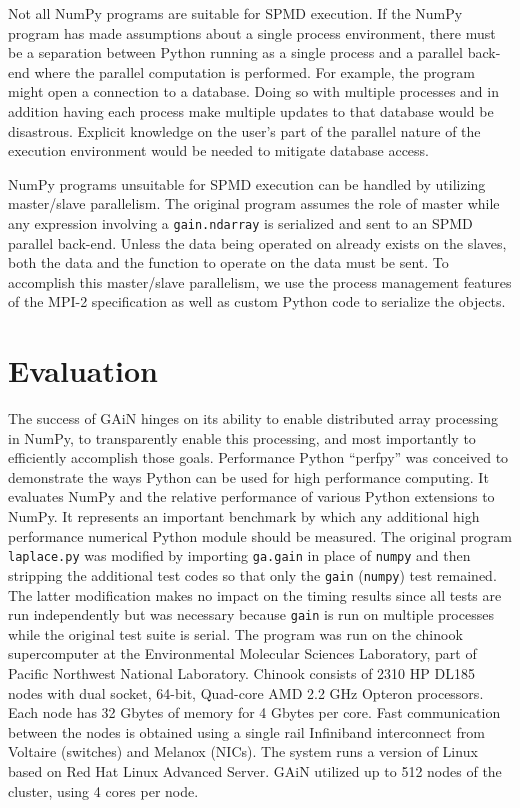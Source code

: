 \documentclass{sigplanconf}
\begin{document}
Not all NumPy programs are suitable for SPMD execution. If the NumPy program
has made assumptions about a single process environment, there must be a
separation between Python running as a single process and a parallel back-end
where the parallel computation is performed. For example, the program might
open a connection to a database. Doing so with multiple processes and in
addition having each process make multiple updates to that database would be
disastrous. Explicit knowledge on the user’s part of the parallel nature of
the execution environment would be needed to mitigate database access.

NumPy programs unsuitable for SPMD execution can be handled by utilizing
master/slave parallelism. The original program assumes the role of master
while any expression involving a \texttt{gain.ndarray} is serialized and sent
to an SPMD parallel back-end. Unless the data being operated on already exists
on the slaves, both the data and the function to operate on the data must be
sent. To accomplish this master/slave parallelism, we use the process
management features of the MPI-2 specification as well as custom Python code
to serialize the objects.

\section{Evaluation}

The success of GAiN hinges on its ability to enable distributed array
processing in NumPy, to transparently enable this processing, and most
importantly to efficiently accomplish those goals. Performance Python
\cite{Ram08} “perfpy” was conceived to demonstrate the ways Python can be used
for high performance computing. It evaluates NumPy and the relative
performance of various Python extensions to NumPy. It represents an important
benchmark by which any additional high performance numerical Python module
should be measured. The original program \verb=laplace.py= was modified by
importing \verb=ga.gain= in place of \verb=numpy= and then stripping the
additional test codes so that only the \verb=gain= (\verb=numpy=) test
remained. The latter modification makes no impact on the timing results since
all tests are run independently but was necessary because \verb=gain= is run
on multiple processes while the original test suite is serial.  The program
was run on the chinook supercomputer at the Environmental Molecular Sciences
Laboratory, part of Pacific Northwest National Laboratory.  Chinook consists
of 2310 HP DL185 nodes with dual socket, 64-bit, Quad-core AMD 2.2 GHz Opteron
processors. Each node has 32 Gbytes of memory for 4 Gbytes per core. Fast
communication between the nodes is obtained using a single rail Infiniband
interconnect from Voltaire (switches) and Melanox (NICs). The system runs a
version of Linux based on Red Hat Linux Advanced Server.  GAiN utilized up to
512 nodes of the cluster, using 4 cores per node.
\end{document}
